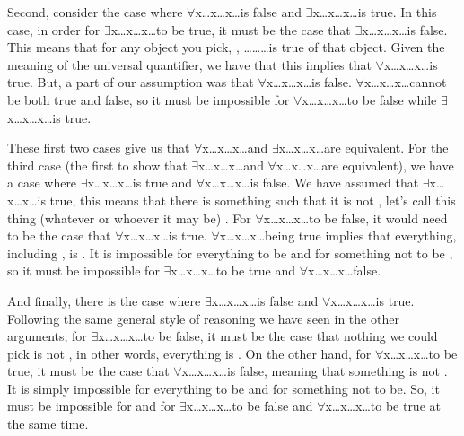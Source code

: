 Second, consider the case where $\forall$x\enot{}\ldots x\ldots x\ldots is false and \enot$\exists$x\ldots x\ldots x\ldots is true. In this case, in order for \enot$\exists$x\ldots x\ldots x\ldots to be true, it must be the case that $\exists$x\ldots x\ldots x\ldots is false. This means that for any object you pick, , \enot{}\ldots{}\ldots{}\ldots is true of that object. Given the meaning of the universal quantifier, we have that this implies that $\forall$x\enot{}\ldots x\ldots x\ldots is true. But, a part of our assumption was that $\forall$x\enot{}\ldots x\ldots x\ldots is false. $\forall$x\enot{}\ldots x\ldots x\ldots cannot be both true and false, so it must be impossible for $\forall$x\enot{}\ldots x\ldots x\ldots to be false while \enot$\exists$x\ldots x\ldots x\ldots is true. 

These first two cases give us that $\forall$x\enot{}\ldots x\ldots x\ldots and \enot$\exists$x\ldots x\ldots x\ldots are equivalent. For the third case (the first to show that $\exists$x\enot{}\ldots x\ldots x\ldots and \enot$\forall$x\ldots x\ldots x\ldots are equivalent), we have a case where $\exists$x\enot{}\ldots x\ldots x\ldots is true and \enot$\forall$x\ldots x\ldots x\ldots is false. We have assumed that $\exists$x\enot{}\ldots x\ldots x\ldots is true, this means that there is something such that it is not , let's call this thing (whatever or whoever it may be) .  For \enot$\forall$x\ldots x\ldots x\ldots to be false, it would need to be the case that $\forall$x\ldots x\ldots x\ldots is true. $\forall$x\ldots x\ldots x\ldots being true implies that everything, including , is . It is impossible for everything to be  and for something not to be , so it must be impossible for $\exists$x\enot{}\ldots x\ldots x\ldots to be true and \enot$\forall$x\ldots x\ldots x\ldots false.

And finally, there is the case where $\exists$x\enot{}\ldots x\ldots x\ldots is false and \enot$\forall$x\ldots x\ldots x\ldots is true. Following the same general style of reasoning we have seen in the other arguments, for $\exists$x\enot{}\ldots x\ldots x\ldots to be false, it must be the case that nothing we could pick is not , in other words, everything is . On the other hand, for \enot$\forall$x\ldots x\ldots x\ldots to be true, it must be the case that $\forall$x\ldots x\ldots x\ldots is false, meaning that something is not . It is simply impossible for everything to be  and for something not to be. So, it must be impossible for  and for  $\exists$x\enot{}\ldots x\ldots x\ldots to be false and \enot$\forall$x\ldots x\ldots x\ldots to be true at the same time.

